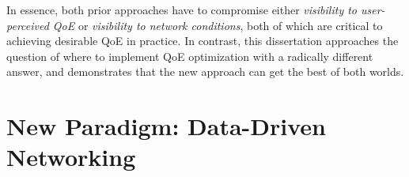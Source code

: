 \begin{itemize}

\end{itemize}

In essence, both prior approaches have to compromise either
{\em visibility to user-perceived QoE} or {\em visibility to network conditions}, 
both of which are critical to achieving desirable QoE in practice. 
In contrast, this dissertation approaches the question of where to implement 
QoE optimization with a radically different answer, and demonstrates that the new approach 
can get the best of both worlds.


\section{New Paradigm: Data-Driven Networking}

